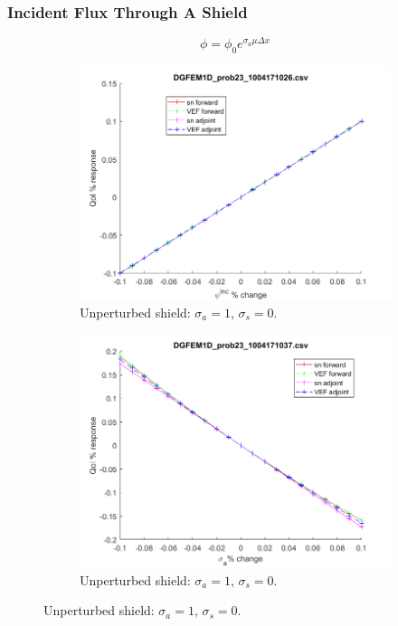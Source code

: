 \documentclass[12pt]{report}
\newcommand{\sigs}{\sigma_s}
\newcommand{\siga}{\sigma_a}
\begin{document}
\subsubsection{Incident Flux Through A Shield}
\begin{equation}
\phi = \phi_0 e^{\sigma_a \mu \Delta x}
\end{equation}
\begin{figure}[H]
\label{Absorber}
\centering
\begin{subfigure}{.5\textwidth}
  \centering
  \includegraphics[width=.98\linewidth]{figures/23incSens.png}
  \caption{Unperturbed shield: $\siga=1$, $\sigs=0$. }
  \label{fig:sfig1}
\end{subfigure}%
\begin{subfigure}{.5\textwidth}
  \centering
  \includegraphics[width=.98\linewidth]{figures/23sigaSens.png}
  \caption{Unperturbed shield: $\siga=1$, $\sigs=0$. }
  \label{fig:sfig2}
\end{subfigure}
\end{figure}
\end{document}
